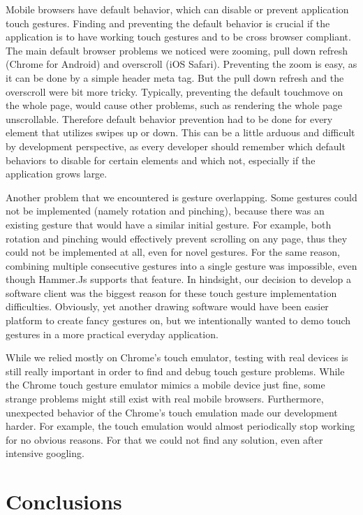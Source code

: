 \documentclass[conference]{IEEEtran}
\begin{document}
Mobile browsers have default behavior, which can disable or prevent application touch gestures. Finding and preventing the default behavior is crucial if the application is to have working touch gestures and to be cross browser compliant. The main default browser problems we noticed were zooming, pull down refresh (Chrome for Android) and overscroll (iOS Safari). Preventing the zoom is easy, as it can be done by a simple header meta tag. But the pull down refresh and the overscroll were bit more tricky. Typically, preventing the default touchmove on the whole page, would cause other problems, such as rendering the whole page unscrollable. Therefore default behavior prevention had to be done for every element that utilizes swipes up or down. This can be a little arduous and difficult by development perspective, as every developer should remember which default behaviors to disable for certain elements and which not, especially if the application grows large.

Another problem that we encountered is gesture overlapping. Some gestures could not be implemented (namely rotation and pinching), because there was an existing gesture that would have a similar initial gesture. For example, both rotation and pinching would effectively prevent scrolling on any page, thus they could not be implemented at all, even for novel gestures. For the same reason, combining multiple consecutive gestures into a single gesture was impossible, even though Hammer.Js supports that feature. In hindsight, our decision to develop a software client was the biggest reason for these touch gesture implementation difficulties. Obviously, yet another drawing software would have been easier platform to create fancy gestures on, but we intentionally wanted to demo touch gestures in a more practical everyday application. 

While we relied mostly on Chrome's touch emulator, testing with real devices is still really important in order to find and debug touch gesture problems. While the Chrome touch gesture emulator mimics a mobile device just fine, some strange problems might still exist with real mobile browsers. Furthermore, unexpected behavior of the Chrome's touch emulation made our development harder. For example, the touch emulation would almost periodically stop working for no obvious reasons. For that we could not find any solution, even after intensive googling. 


\section{Conclusions}
\end{document}
